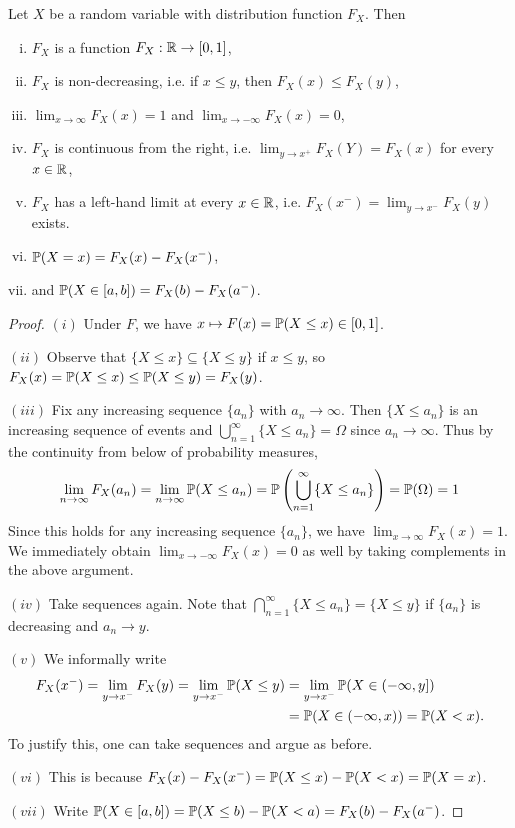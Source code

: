 \begin{prop}
  Let $X$ be a random variable with distribution
  function $F_X$. Then
  \begin{enumerate}[(i)]
    \item $F_X$ is a function $F_X : \mathbb{R} \to [0, 1]$,
    \item $F_X$ is non-decreasing, i.e.
      if $x \le y$, then $F_X(x) \le F_X(y)$,
    \item $\lim_{x \to \infty} F_X(x) = 1$ and
      $\lim_{x \to -\infty} F_X(x) = 0$,
    \item $F_X$ is continuous from the right, i.e.
      $\lim_{y \to x^+} F_X(Y) = F_X(x)$ for every
      $x \in \mathbb{R}$,
    \item $F_X$ has a left-hand limit at
      every $x \in \mathbb{R}$, i.e.
      $F_X(x^-) = \lim_{y \to x^-} F_X(y)$ exists.
    \item $\mathbb{P}(X = x) = F_X(x) - F_X(x^-)$,
    \item and $\mathbb{P}(X \in [a, b]) = F_X(b) - F_X(a^-)$.
  \end{enumerate}
\end{prop}

\begin{proof}
  $(i)$ Under $F$, we have $x \mapsto F(x) = \mathbb{P}(X \le x) \in [0, 1]$.

  $(ii)$ Observe that
  $\{X \le x\} \subseteq \{X \le y\}$ if $x \le y$,
  so $F_X(x) = \mathbb{P}(X \le x) \le \mathbb{P}(X \le y) = F_X(y)$.

  $(iii)$ Fix any increasing
  sequence $\{a_n\}$ with $a_n \to \infty$. Then
  $\{X \le a_n\}$ is an increasing sequence of
  events and $\bigcup_{n = 1}^\infty \{X \le a_n\} = \Omega$
  since $a_n \to \infty$. Thus by the continuity
  from below of probability measures,
  \[
    \lim_{n \to \infty} F_X(a_n)
    = \lim_{n \to \infty} \mathbb{P}(X \le a_n)
    = \mathbb{P}\left(\bigcup_{n = 1}^\infty \{X \le a_n\}\right)
    = \mathbb{P}(\Omega)
    = 1
  \]
  Since this holds for any increasing
  sequence $\{a_n\}$, we have
  $\lim_{x \to \infty} F_X(x) = 1$. We immediately
  obtain $\lim_{x \to -\infty} F_X(x) = 0$ as well
  by taking complements in the above argument.

  $(iv)$ Take sequences again. Note that
  $\bigcap_{n = 1}^\infty \{X \le a_n\} = \{X \le y\}$
  if $\{a_n\}$ is decreasing and $a_n \to y$.

  $(v)$ We informally write
  \begin{align*}
    F_X(x^-)
    = \lim_{y \to x^-} F_X(y)
    = \lim_{y \to x^-} \mathbb{P}(X \le y)
    &= \lim_{y \to x^-} \mathbb{P}(X \in (-\infty, y]) \\
    &= \mathbb{P}(X \in (-\infty, x))
    = \mathbb{P}(X < x).
  \end{align*}
  To justify this, one can take sequences and
  argue as before.

  $(vi)$ This is because
  $F_X(x) - F_X(x^-) = \mathbb{P}(X \le x) - \mathbb{P}(X < x) = \mathbb{P}(X = x)$.

  $(vii)$ Write
  $\mathbb{P}(X \in [a, b]) = \mathbb{P}(X \le b) - \mathbb{P}(X < a) = F_X(b) - F_X(a^-)$.
\end{proof}

